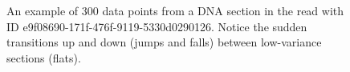 \begin{figure}
\centering

	\caption[An example of 300 data points from a DNA
	section in the read with ID e9f08690-171f-476f-9119-5330d0290126.]{\label{fig:dna300-section}An example of 300 data points from a DNA
	section in the read with ID e9f08690-171f-476f-9119-5330d0290126. Notice
	the sudden transitions up and down (jumps and falls) between
	low-variance sections (flats).}
\end{figure}
